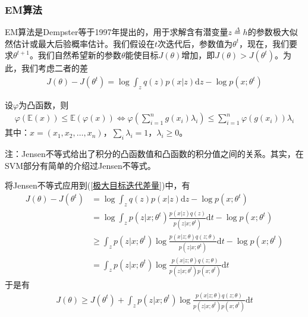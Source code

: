         \subsubsection{EM算法}
            \par
            EM算法是Dempster等于1997年提出的，用于求解含有潜变量$z \overset{\Delta}{=}h$的参数极大似然估计或最大后验概率估计。我们假设在$t$次迭代后，参数值为$\theta^t$，现在，我们要求$\theta^{t+1}$。我们自然希望新的参数$\theta$能使目标$J(\theta)$增加，即$J(\theta)>J(\theta^t)$。为此，我们考虑二者的差
            \begin{align}
            \label{极大目标迭代差量}
            J(\theta) - J(\theta^t) = \log \int_z q(z)p(x|z)\mathrm{d}z - \log p(x;\theta^t)
            \end{align}
            \begin{lemma}[Jensen不等式]
            设$\varphi$为凸函数，则
            \begin{align*}
            \varphi(\mathbb{E}(x)) \leqslant \mathbb{E}(\varphi(x)) \Leftrightarrow\varphi \left( \sum_{i=1}^ng(x_i) \lambda_i\right) \leqslant \sum_{i=1}^n\varphi(g(x_i))\lambda_i
            \end{align*}
            其中：$x = (x_1,x_2,\dots,x_n)$，$\sum_i\lambda_i = 1$，$\lambda_i \geqslant 0$。
            \end{lemma}
            注：Jensen不等式给出了积分的凸函数值和凸函数的积分值之间的关系。其实，在SVM部分有简单的介绍过Jensen不等式。
            \par
            将Jensen不等式应用到(\ref{极大目标迭代差量})中，有
            \begin{align*}
            J(\theta) - J(\theta^t) &= \log \int_z q(z)p(x|z)\mathrm{d}z - \log p(x;\theta^t)\\
            &=\log \int_zp(z|x;\theta^t) \frac{p(x|z)q(z)}{p(z|x;\theta^t)}\mathrm{d}t - \log p(x;\theta^t)\\
            & \geqslant \int_zp(z|x;\theta^t) \log\frac{p(x|z;\theta) q(z;\theta)}{p(z|x;\theta^t)}\mathrm{d}t - \log p(x;\theta^t)\\
            &=\int_zp(z|x;\theta^t) \log\frac{p(x|z;\theta) q(z;\theta)}{p(z|x;\theta^t)p(x;\theta^t)}\mathrm{d}t
            \end{align*}
            于是有
            \begin{align*}
            J(\theta) \geqslant J(\theta^t) + \int_zp(z|x;\theta^t) \log\frac{p(x|z;\theta) q(z;\theta)}{p(z|x;\theta^t)p(x;\theta^t)}\mathrm{d}t
            \end{align*}
